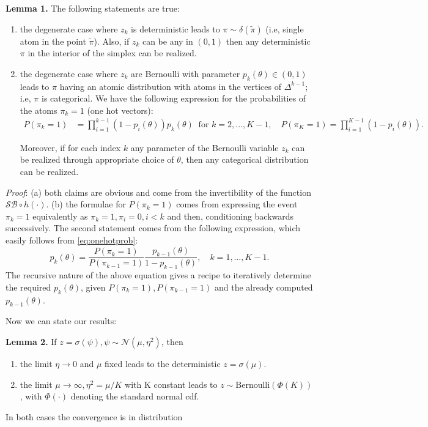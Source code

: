 \textbf{Lemma 1.}  The following statements are true:
\begin{enumerate} \item the degenerate case where  $z_k$ is deterministic leads to $\pi\sim \delta(\tilde{\pi})$  (i.e, single atom in the point $\tilde{\pi}$). Also, if $z_k$ can be any in $(0,1)$ then any deterministic $\pi$ in the interior of the simplex can be realized.
\item the degenerate case where  $z_k$ are Bernoulli with parameter $p_k(\theta) \in (0,1)$ leads to $\pi$ having an atomic distribution with atoms in the vertices of $\Delta^{k-1}$; i.e, $\pi$ is categorical. We have the following expression for the probabilities of the atoms $\pi_k=1$ (one hot vectors):
\begin{align}
\label{eq:onehotprob}
P(\pi_k =1)&= \prod_{i=1}^{k-1} (1-p_i(\theta)) p_k(\theta)  \;\; \text{for } k=2, \ldots, K-1, \quad P(\pi_K =1) = \prod_{i=1}^{K-1} (1-p_i(\theta)).
\end{align}

Moreover, if for each index $k$ any parameter of the Bernoulli variable $z_k$ can be realized through appropriate choice of $\theta$, then any categorical distribution can be realized.

\end{enumerate}
\textit{Proof}: (a) both claims are obvious and come from the invertibility of the function $\mathcal{SB} \circ h (\cdot)$. (b) the formulae for $P(\pi_k =1)$ comes from expressing the event $\pi_k=1$ equivalently as $\pi_k=1,\pi_i=0, i<k$ and then, conditioning backwards successively. The second statement comes from the following expression, which easily follows  from \eqref{eq:onehotprob}:
$$ p_k(\theta)=\frac{P(\pi_k =1)}{P(\pi_{k-1} =1)}\frac{p_{k-1}(\theta)}{1-p_{k-1}(\theta)},\quad k =1,\ldots, K-1.$$
The recursive nature of the above equation gives a recipe to iteratively determine the required $p_k(\theta)$, given  $P(\pi_k =1), P(\pi_{k-1} =1)$ and the already computed $p_{k-1}(\theta)$.


Now we can state our results:

\textbf{Lemma 2.} If $z=\sigma(\psi),\psi\sim\mathcal{N}(\mu,\eta^2)$, then
\begin{enumerate} \item the  limit $\eta\rightarrow 0$ and $\mu$ fixed leads to the deterministic $z=\sigma(\mu)$. 
\item the limit $\mu\rightarrow \infty, \eta^2=\mu/K$ with K constant leads to $z\sim \text{Bernoulli}(\Phi(K))$, with $\Phi(\cdot)$ denoting the standard normal cdf.
\end{enumerate} In both cases the convergence is in distribution 

